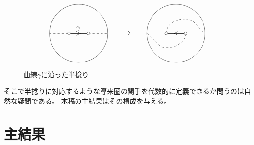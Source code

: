 \documentclass[uplatex,a4paper,dvipdfmx]{jsarticle}
\numberwithin{equation}{section}
\theoremstyle{definition}
\begin{document}
\begin{figure}[h]\label{fig:half_twist}
	\begin{displaymath}
		\begin{tikzpicture}
			\draw (0, 1.5) circle[radius=1.5];
			\draw[thick] (-0.5, 1.5)--(0.5, 1.5);
			\draw(0, 1.5) node{$>$};
			\draw[dashed] (-1.5, 1.5)--(-0.5, 1.5);
			\draw[dashed] (0.5, 1.5)--(1.5, 1.5);

			\foreach \u in {-0.5, 0.5}
				{
					\filldraw[white] (\u, 1.5) circle (2pt);
					\draw[black] (\u, 1.5) circle (2pt);
				}
			\draw(0, 1.5) node[above]{$\gamma$};

			\draw(2.5, 1.5) node{$\rightarrow$};

			\draw (0+5, 1.5) circle[radius=1.5];
			\draw[thick] (-0.5+5, 1.5)--(0.5+5, 1.5);
			\draw(5, 1.5) node{$<$};


			\draw[dashed](-1.5+5, 1.5) to[out=-30,in=180](-0.5+5, 0.75);
			\draw[dashed](-0.5+5, 0.75) to[out=0,in=-90](0.5+5, 1.5);

			\draw[dashed](-0.5+5, 1.5) to[out=90,in=180](0.5+5, 2.25);
			\draw[dashed](0.5+5, 2.25) to[out=0,in=150](1.5+5, 1.5);


			\foreach \u in {-0.5, 0.5}
				{
					\filldraw[white] (\u+5, 1.5) circle (2pt);
					\draw[black] (\u+5, 1.5) circle (2pt);
				}
		\end{tikzpicture}
	\end{displaymath}
	\caption{曲線$\gamma$に沿った半捻り}
\end{figure}
そこで半捻りに対応するような導来圏の関手を代数的に定義できるか問うのは自然な疑問である。
本稿の主結果はその構成を与える。
\section{主結果}
\end{document}

